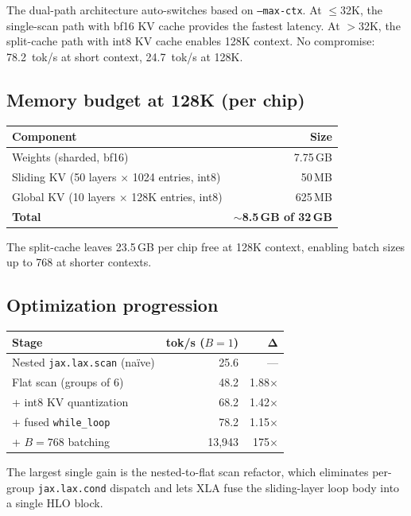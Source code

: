 \vspace{0.5em}
\noindent The dual-path architecture auto-switches based on
\texttt{--max-ctx}. At $\le$32K, the single-scan path with bf16 KV
cache provides the fastest latency. At $>$32K, the split-cache path
with int8 KV cache enables 128K context. No compromise: 78.2~tok/s
at short context, 24.7~tok/s at 128K.

\subsection{Memory budget at 128K (per chip)}

\begin{tabular}{lr}
\toprule
\textbf{Component} & \textbf{Size} \\
\midrule
Weights (sharded, bf16) & 7.75\,GB \\
Sliding KV (50 layers $\times$ 1024 entries, int8) & 50\,MB \\
Global KV (10 layers $\times$ 128K entries, int8)  & 625\,MB \\
\midrule
\textbf{Total} & \textbf{$\sim$8.5\,GB of 32\,GB} \\
\bottomrule
\end{tabular}

\vspace{0.5em}
\noindent The split-cache leaves 23.5\,GB per chip free at 128K context,
enabling batch sizes up to 768 at shorter contexts.

\subsection{Optimization progression}

\begin{tabular}{lrr}
\toprule
\textbf{Stage} & \textbf{tok/s ($B\!=\!1$)} & $\boldsymbol\Delta$ \\
\midrule
Nested \texttt{jax.lax.scan} (na\"ive)  & 25.6 & --- \\
Flat scan (groups of 6)                 & 48.2 & 1.88$\times$ \\
+ int8 KV quantization                 & 68.2 & 1.42$\times$ \\
+ fused \texttt{while\_loop}            & 78.2 & 1.15$\times$ \\
+ $B\!=\!768$ batching                  & 13{,}943 & 175$\times$ \\
\bottomrule
\end{tabular}

\vspace{0.5em}
\noindent The largest single gain is the nested-to-flat scan refactor,
which eliminates per-group \texttt{jax.lax.cond} dispatch and lets XLA
fuse the sliding-layer loop body into a single HLO block.

